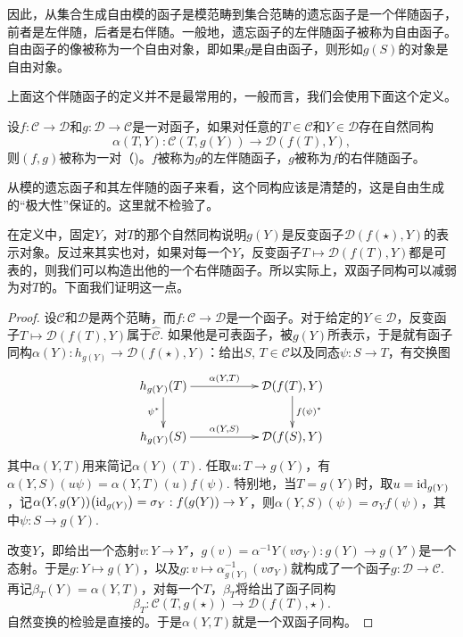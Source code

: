因此，从集合生成自由模的函子是模范畴到集合范畴的遗忘函子是一个伴随函子，前者是左伴随，后者是右伴随。一般地，遗忘函子的左伴随函子被称为自由函子。自由函子的像被称为一个自由对象，即如果$g$是自由函子，则形如$g(S)$的对象是自由对象。

上面这个伴随函子的定义并不是最常用的，一般而言，我们会使用下面这个定义。

\begin{para}
设$f:\mathcal{C}\to \mathcal{D}$和$g:\mathcal{D}\to \mathcal{C}$是一对函子，如果对任意的$T\in\mathcal{C}$和$Y\in\mathcal{D}$存在自然同构
\[
	\alpha(T,Y):\mathcal{C}(T,g(Y))\to \mathcal{D}(f(T),Y),
\]
则$(f,g)$被称为一对（)。$f$被称为$g$的左伴随函子，$g$被称为$f$的右伴随函子。
\end{para}

从模的遗忘函子和其左伴随的函子来看，这个同构应该是清楚的，这是自由生成的“极大性”保证的。这里就不检验了。

在定义中，固定$Y$，对$T$的那个自然同构说明$g(Y)$是反变函子$\mathcal{D}(f(\star),Y)$的表示对象。反过来其实也对，如果对每一个$Y$，反变函子$T\mapsto {\mathcal{D}}(f(T),Y)$都是可表的，则我们可以构造出他的一个右伴随函子。所以实际上，双函子同构可以减弱为对$T$的。下面我们证明这一点。

\begin{proof} 
	设$\mathcal{C}$和$\mathcal{D}$是两个范畴，而$f:\mathcal{C}\to \mathcal{D}$是一个函子。对于给定的$Y\in\mathcal{D}$，反变函子$T\mapsto {\mathcal{D}}(f(T),Y)$属于$\hat{\mathcal{C}}$. 如果他是可表函子，被$g(Y)$所表示，于是就有函子同构$\alpha(Y):h_{g(Y)}\to {\mathcal{D}}(f(\star),Y)$：给出$S$, $T\in \mathcal{C}$以及同态$\psi:S\to T$，有交换图
	\[
	\begin{xy}
		\xymatrix{
			h_{g(Y)}(T)\ar[rr]^-{\alpha(Y,T)} \ar[d]_{\psi^*}&&{\mathcal{D}}(f(T),Y) \ar[d]^{f(\psi)^*}\\
			h_{g(Y)}(S)\ar[rr]^-{\alpha(Y,S)}&&{\mathcal{D}}(f(S),Y)
		}
	\end{xy}
	\]
	其中$\alpha(Y,T)$用来简记$\alpha(Y)(T)$. 任取$u:T\to {g(Y)}$，有$\alpha(Y,S)(u\psi)=\alpha(Y,T)(u)f(\psi)$. 特别地，当$T=g(Y)$时，取$u=\operatorname{id}_{g(Y)}$，记$\alpha(Y,g(Y))\bigl(\operatorname{id}_{g(Y)}\bigr)=\sigma_Y:f(g(Y))\to Y$，则$\alpha(Y,S)(\psi)=\sigma_Y f(\psi)$，其中$\psi:S\to g(Y)$.

	改变$Y$，即给出一个态射$v:Y\to Y'$，$g(v)=\alpha^{-1}{Y}\left(v\sigma_Y\right):g(Y)\to g(Y')$是一个态射。于是$g:Y\mapsto g(Y)$，以及$g:v\mapsto \alpha^{-1}_{g(Y)}\left(v\sigma_Y\right)$就构成了一个函子$g:\mathcal{D}\to \mathcal{C}$. 再记$\beta_T(Y)=\alpha(Y,T)$，对每一个$T$，$\beta_T$将给出了函子同构
	\[
		\beta_T:\mathcal{C}(T,g(\star))\to \mathcal{D}(f(T),\star).
	\]
	自然变换的检验是直接的。于是$\alpha(Y,T)$就是一个双函子同构。
\end{proof}

